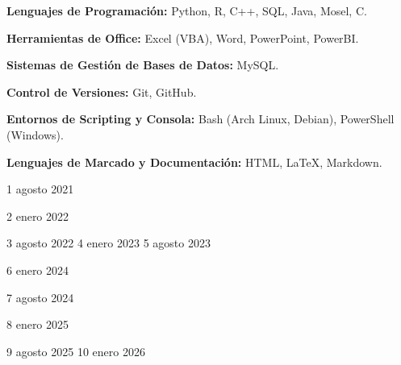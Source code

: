 \documentclass[8pt]{extarticle} %
\begin{document}
\begin{multicols}{2}
\textbf{Lenguajes de Programación:} Python, R, C++, SQL, Java, Mosel, C.

\textbf{Herramientas de Office:} Excel (VBA), Word, PowerPoint, PowerBI.

\textbf{Sistemas de Gestión de Bases de Datos:} MySQL.

\textbf{Control de Versiones:} Git, GitHub.

\textbf{Entornos de Scripting y Consola:} Bash (Arch Linux, Debian), PowerShell (Windows).

\textbf{Lenguajes de Marcado y Documentación:} HTML, LaTeX, Markdown.
\end{multicols}


1 agosto 2021 

2 enero 2022


3 agosto 2022
4 enero 2023
5 agosto 2023

6 enero 2024

7 agosto 2024

8 enero 2025


9 agosto 2025
10 enero 2026
\end{document}
